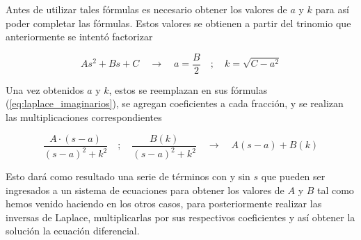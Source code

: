 Antes de utilizar tales fórmulas es necesario obtener los valores de $a$ y $k$ para así poder completar las fórmulas. Estos valores se obtienen a partir del trinomio que anteriormente se intentó factorizar

\begin{equation*}
    As^{2} + Bs + C \quad \longrightarrow \quad a = \frac{B}{2} \quad ; \quad k = \sqrt{C - a^{2}}
\end{equation*}

Una vez obtenidos $a$ y $k$, estos se reemplazan en sus fórmulas (\autoref{eq:laplace_imaginarios}), se agregan coeficientes a cada fracción, y se realizan las multiplicaciones correspondientes

\begin{equation*}
    \frac{A \cdot (s - a)}{(s-a)^{2}+k^{2}} \quad ; \quad \frac{B(k)}{(s-a)^{2}+k^{2}} \quad \longrightarrow \quad A(s-a) + B(k)
\end{equation*}

Esto dará como resultado una serie de términos con y sin $s$ que pueden ser ingresados a un sistema de ecuaciones para obtener los valores de $A$ y $B$ tal como hemos venido haciendo en los otros casos, para posteriormente realizar las inversas de Laplace, multiplicarlas por sus respectivos coeficientes y así obtener la solución la ecuación diferencial.